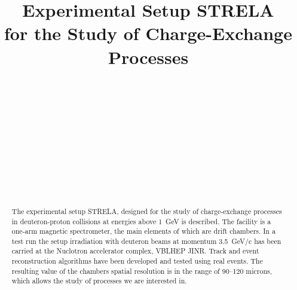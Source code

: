 \documentclass[aps,12pt,final,notitlepage,oneside,onecolumn,nobibnotes,
  nofootinbib,superscriptaddress,noshowpacs,centertags]{revtex4}
\begin{document}

\title{Experimental Setup STRELA \\
  for the Study of Charge-Exchange Processes}
\author{~}
\author{~}
\author{~}
\author{~}
\author{~}
\author{~}

\begin{abstract}
  The experimental setup STRELA, designed for the study of charge-exchange
  processes in deuteron-proton collisions at energies above 1~GeV is described.
  The facility is a one-arm magnetic spectrometer, the main elements of which
  are  drift chambers. In a test run the setup irradiation with deuteron beams
  at momentum 3.5~GeV/c has been carried at the Nuclotron accelerator complex,
  VBLHEP JINR. Track and event reconstruction algorithms have been developed and
  tested using real events. The resulting value of the chambers spatial
  resolution is in the range of 90--120 microns, which allows the study of
  processes we are interested in.
\end{abstract}

\maketitle
\end{document}
